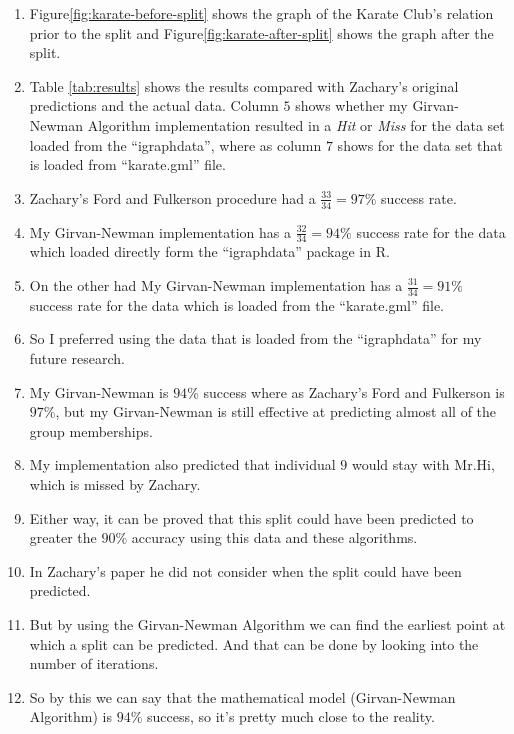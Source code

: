 \begin{enumerate}
\item Figure\ref{fig:karate-before-split} shows the graph of the Karate Club's relation prior to the split and Figure\ref{fig:karate-after-split} shows the graph after the split.
\item Table \ref{tab:results} shows the results compared with Zachary's original predictions and the actual data. Column $5$ shows whether my Girvan-Newman Algorithm implementation resulted in a \emph{Hit} or \emph{Miss} for the data set loaded from the ``igraphdata'', where as column $7$ shows for the data set that is loaded from ``karate.gml'' file.
\item Zachary's Ford and Fulkerson procedure had a $\frac{33}{34} = 97\%$ success rate.  
\item My Girvan-Newman implementation has a $\frac{32}{34} = 94\%$ success rate for the data which loaded directly form the ``igraphdata'' package in R.
\item On the other had My Girvan-Newman implementation has a $\frac{31}{34} = 91\%$ success rate for the data which is loaded from the ``karate.gml'' file. 
\item So I preferred using the data that is loaded from the ``igraphdata'' for my future research.
\item My Girvan-Newman is $94\%$ success where as Zachary's Ford and Fulkerson is $97\%$, but my Girvan-Newman is still effective at predicting almost all of the group memberships. 
\item My implementation also predicted that individual $9$ would stay with Mr.Hi, which is missed by Zachary.
\item Either way, it can be proved that this split could have been predicted to greater the  $90\%$ accuracy using this data and these algorithms. 
\item In Zachary's paper he did not consider when the split could have been predicted. 
\item But by using the Girvan-Newman Algorithm we can find the earliest point at which a split can be predicted. And that can be done by looking into the number of iterations.
\item So by this we can say that the mathematical model (Girvan-Newman Algorithm) is $94\%$ success, so it's pretty much close to the reality. 

\end{enumerate}

\newpage

